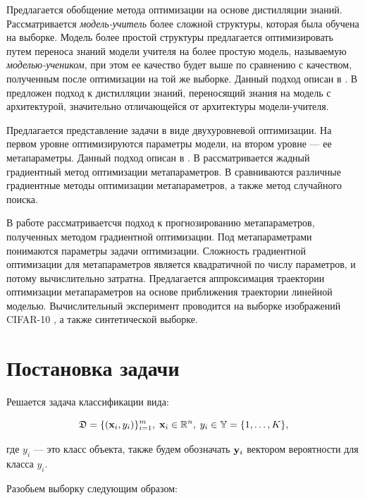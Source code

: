 \documentclass[12pt, twoside]{article}
\begin{document}
Предлагается обобщение метода оптимизации на основе дистилляции знаний. Рассматривается \textit{модель-учитель} более сложной структуры, которая была обучена на выборке. Модель более простой структуры предлагается оптимизировать путем переноса знаний модели учителя на более простую модель, называемую \textit{моделью-учеником}, при этом ее качество будет выше по сравнению с качеством, полученным после оптимизации на той же выборке. Данный подход описан в \cite{journals/corr/HintonVD15}. В \cite{conf/cvpr/PassalisTT20} предложен подход к дистилляции знаний, переносящий знания на модель с архитектурой, значительно отличающейся от архитектуры модели-учителя.

Предлагается представление задачи в виде двухуровневой оптимизации. На первом уровне оптимизируются параметры модели, на втором уровне --- ее метапараметры. Данный подход описан в \cite{journals/corr/LuketinaBR15, journals/anor/BakhteevS20, journals/corr/MaclaurinDA15}. В \cite{journals/corr/LuketinaBR15} рассматривается жадный градиентный метод оптимизации метапараметров. В \cite{journals/anor/BakhteevS20} сравниваются различные градиентные методы оптимизации метапараметров, а также метод случайного поиска.

В работе рассматриваетсчя подход к прогнозированию метапараметров, полученных методом градиентной оптимизации. Под метапараметрами понимаются параметры задачи оптимизации. Сложность градиентной оптимизации для метапараметров является квадратичной по числу параметров, и потому вычислительно затратна. Предлагается аппроксимация траектории оптимизации метапараметров на основе приближения траектории линейной моделью. Вычислительный эксперимент проводится на выборке изображений CIFAR-10 \cite{krizhevsky2009learning}, а также синтетической выборке.

\section{Постановка задачи}
Решается задача классификации вида:

\begin{equation} \label{eq:data}
    \fD = \{(\bx_i, y_i)\}_{i=1}^{m},\; \bx_i \in \bbR^n,\; y_i \in \bbY = \{1, \dots, K\},
\end{equation}

\noindent
где $y_i$ — это класс объекта, также будем обозначать $\mathbf{y}_i$ вектором вероятности для
класса $y_i$.

Разобьем выборку следующим образом:
\end{document}
